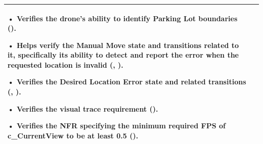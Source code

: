 \documentclass[12pt, titlepage]{article}
\begin{document}
\begin{table}[!h]
\begin{center}
\begin{tabular}{ | m{3.2cm} | m{12.2cm} | }
• Verifies the drone’s ability to identify Parking Lot boundaries (\nameref{GEN_001}).

• Helps verify the Manual Move state and transitions related to it, specifically its ability to detect and report the error when the requested location is invalid (\nameref{STA_002}, \nameref{TRANS_005}).

• Verifies the Desired Location Error state and related transitions (\nameref{STA_007}, \nameref{TRANS_006}). 

• Verifies the visual trace requirement (\nameref{USE_001}). 

• Verifies the NFR specifying the minimum required FPS of c\_CurrentView to be at least 0.5 (\nameref{PERF_004}).
\\ 
\hline
\end{tabular}
\end{center}
\end{table}
\end{document}
